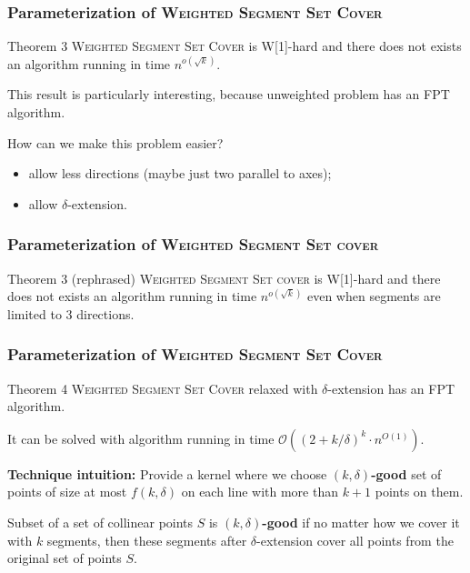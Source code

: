\documentclass{beamer}
\begin{document}
\begin{frame}
\frametitle{Parameterization of \textsc{Weighted Segment Set Cover}}
\begin{block}{Theorem 3}
	\textsc{Weighted Segment Set Cover} is W[1]-hard
	and there does not exists an algorithm running in time $n^{o(\sqrt{k})}$.
\end{block}


This result is particularly interesting, because unweighted problem 
has an FPT algorithm.

\bigskip

How can we make this problem easier?
\begin{itemize}
\item allow less directions (maybe just two parallel to axes);
\item allow $\delta$-extension.
\end{itemize}
\end{frame}

\begin{frame}
\frametitle{Parameterization of \textsc{Weighted Segment Set cover}}

\begin{block}{Theorem 3 (rephrased)}
	\textsc{Weighted Segment Set cover} is W[1]-hard
	and there does not exists an algorithm running in time $n^{o(\sqrt{k})}$
	even when segments are limited to 3 directions.
\end{block}

\end{frame}

\begin{frame}
\frametitle{Parameterization of \textsc{Weighted Segment Set Cover}}
\begin{block}{Theorem 4}
	\textsc{Weighted Segment Set Cover} relaxed
	with $\delta$-extension has an FPT algorithm.
	
	It can be solved with algorithm running in time $\mathcal{O}((2+k/\delta)^k \cdot n^{O(1)})$.
\end{block}

\textbf{Technique intuition:} Provide a kernel where we choose
\textbf{$(k, \delta)$-good} set of points of size at most $f(k, \delta)$
on each line with more than $k+1$ points on them.

Subset of a set of collinear points $S$
is \textbf{$(k, \delta)$-good}
if no matter how we cover it with $k$
segments, then these segments after $\delta$-extension
cover all points from the original set of points $S$.
\end{frame}
\end{document}

